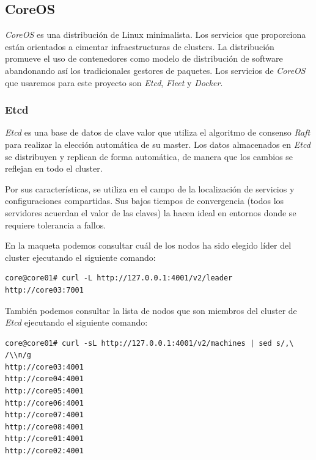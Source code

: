 \documentclass[a4paper,12pt,spanish,final]{epsc_tfc_pfc}
\begin{document}
\subsection{CoreOS}

\emph{CoreOS} es una distribución de Linux minimalista. Los servicios que proporciona están orientados a cimentar infraestructuras de clusters. La distribución promueve el uso de contenedores como modelo de distribución de software abandonando así los tradicionales gestores de paquetes. Los servicios de \emph{CoreOS} que usaremos para este proyecto son \emph{Etcd}, \emph{Fleet} y \emph{Docker}.

\subsubsection{Etcd}

\emph{Etcd} es una base de datos de clave valor que utiliza el algoritmo de consenso \emph{Raft} para realizar la elección automática de su master. Los datos almacenados en \emph{Etcd} se distribuyen y replican de forma automática, de manera que los cambios se reflejan en todo el cluster.

Por sus características, se utiliza en el campo de la localización de servicios y configuraciones compartidas. Sus bajos tiempos de convergencia (todos los servidores acuerdan el valor de las claves) la hacen ideal en entornos donde se requiere tolerancia a fallos.

En la maqueta podemos consultar cuál de los nodos ha sido elegido líder del cluster ejecutando el siguiente comando:\\

\begin{lstlisting}[style=dnsmasq]
core@core01# curl -L http://127.0.0.1:4001/v2/leader
http://core03:7001
\end{lstlisting}

También podemos consultar la lista de nodos que son miembros del cluster de \emph{Etcd} ejecutando el siguiente comando:\\

\begin{lstlisting}[style=dnsmasq]
core@core01# curl -sL http://127.0.0.1:4001/v2/machines | sed s/,\ /\\n/g
http://core03:4001
http://core04:4001
http://core05:4001
http://core06:4001
http://core07:4001
http://core08:4001
http://core01:4001
http://core02:4001
\end{lstlisting}
\end{document}
